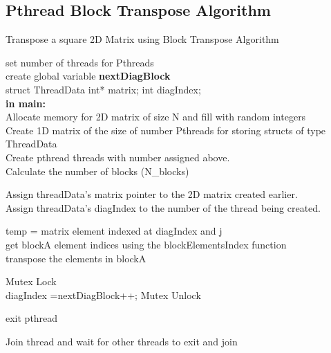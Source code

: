 \documentclass[10pt,onecolumn]{article}
\begin{document}
\subsection{Pthread Block Transpose Algorithm}
%
\begin{algorithm}[H]
    \caption{Transpose a square 2D Matrix using Block Transpose Algorithm}
    set number of threads for Pthreads\\
    create global variable \textbf{nextDiagBlock} \\
    struct ThreadData{ int* matrix; int diagIndex;} \\
    
    \textbf{in main:} \\
    Allocate memory for 2D matrix of size N and fill with random integers \\
    Create 1D matrix of the size of number Pthreads for storing structs of type ThreadData \\
    Create pthread threads with number assigned above.\\
    Calculate the number of blocks (N\_blocks)\\
    {   
        Assign threadData's matrix pointer to the 2D matrix created earlier.\\
        Assign threadData's diagIndex to the number of the thread being created.\\
        {
            {
                temp = matrix element indexed at diagIndex and j \\
                get blockA element indices using the blockElementsIndex function\\
                transpose the elements in blockA\\
            }
            
            Mutex Lock\\
             {diagIndex =nextDiagBlock++;}
            Mutex Unlock\\
            
        }
        exit pthread
    }
    
    {
        Join thread and wait for other threads to exit and join
    }
\end{algorithm}
%
\end{document}
